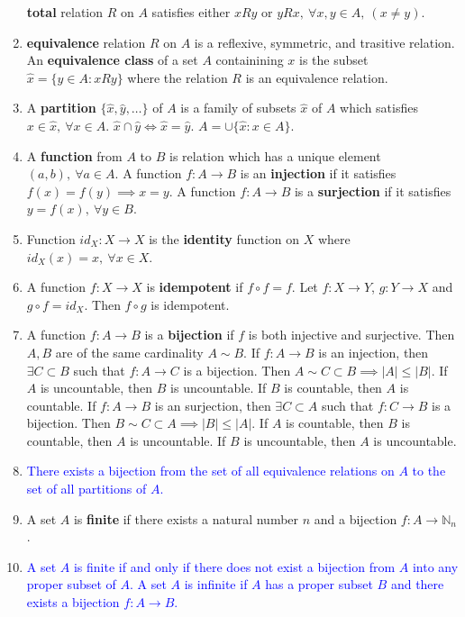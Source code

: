 \begin{enumerate}
		\subitem \textbf{total} relation $R$ on $A$ satisfies either $xRy \text{ or } yRx,\ \forall x,y \in A,\ (x \ne y)$.  \item \textbf{equivalence} relation $R$ on $A$ is a reflexive, symmetric, and trasitive relation.
		\subitem An \textbf{equivalence class} of a set $A$ containining $x$ is the subset $\hat{x} = \{ y \in A : xRy \}$ where the relation $R$ is an equivalence relation.
	\item A \textbf{partition} $\{\hat{x},\hat{y},\dots\}$ of $A$ is a family of subsets $\hat{x}$ of $A$ which satisfies
		\subitem $x \in \hat{x},\ \forall x \in A$.
		\subitem $\hat{x} \cap \hat{y} \iff \hat{x} = \hat{y}$.
		\subitem $A = \cup \{ \hat{x} : x \in A\}$.
	\item A \textbf{function} from $A$ to $B$ is relation which has a unique element $(a,b),\ \forall a \in A$.
		\subitem A function $f : A \to B$ is an \textbf{injection} if it satisfies $f(x) = f(y) \implies x = y$. 
		\subitem A function $f : A \to B$ is a \textbf{surjection} if it satisfies $y = f(x),\ \forall y \in B$.
	\item Function $id_X : X \to X$  is the \textbf{identity} function on $X$ where $id_X(x) = x,\ \forall x \in X$.
	\item A function $f : X \to X$ is \textbf{idempotent} if $f \circ f = f$.
		\subitem Let $f:X \to Y$, $g:Y \to X$ and $g \circ f = id_X$. Then $f \circ g$ is idempotent.
	\item A function $f : A \to B$ is a \textbf{bijection} if $f$ is both injective and surjective.
	Then $A,B$ are of the same cardinality $A \sim B$.
		\subitem If $f : A \to B$ is an injection, then $\exists C \subset B$ such that $f : A \to C$ is a bijection.
		Then $A \sim C \subset B \implies |A| \le |B|$.
		If $A$ is uncountable, then $B$ is uncountable. If $B$ is countable, then $A$ is countable.
		\subitem If $f : A \to B$ is an surjection, then $\exists C \subset A$ such that $f : C \to B$ is a bijection.
		Then $B \sim C \subset A \implies |B| \le |A|$.
		If $A$ is countable, then $B$ is countable, then $A$ is uncountable.
		If $B$ is uncountable, then $A$ is uncountable.
	\item \textcolor{blue}{There exists a bijection from the set of all equivalence relations on $A$ to the set of all partitions of $A$.}
	\item A set $A$ is \textbf{finite} if there exists a natural number $n$ and a bijection $f : A \to \mathbb{N}_n$.
	\item \textcolor{blue}{A set $A$ is finite if and only if there does not exist a bijection from $A$ into any proper subset of $A$. A set $A$ is infinite if $A$ has a proper subset $B$ and there exists a bijection $f : A \to B$.}

\end{enumerate}
